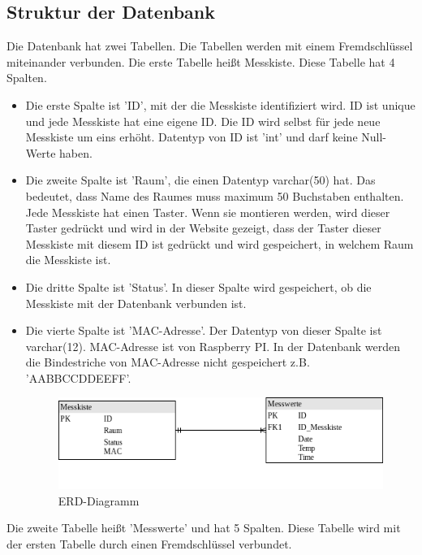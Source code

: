 	\subsection{Struktur der Datenbank}
	Die Datenbank hat zwei Tabellen. Die Tabellen werden mit einem Fremdschl\"ussel miteinander verbunden. Die erste Tabelle hei{\ss}t Messkiste. Diese Tabelle hat 4 Spalten. 
	\begin{itemize}
		\item Die erste Spalte ist 'ID', mit der die Messkiste identifiziert wird. ID ist unique und jede Messkiste hat eine eigene ID. Die ID wird selbst f\"ur jede neue Messkiste um eins erh\"oht. Datentyp von ID ist 'int' und darf keine Null-Werte haben. 
		\item Die zweite Spalte ist 'Raum', die einen Datentyp varchar(50) hat. Das bedeutet, dass Name des Raumes muss maximum 50 Buchstaben enthalten. Jede Messkiste hat einen Taster. Wenn sie montieren werden, wird dieser Taster gedr\"uckt und wird in der Website gezeigt, dass der Taster dieser Messkiste mit diesem ID ist gedr\"uckt und wird gespeichert, in welchem Raum die Messkiste ist.
		\item Die dritte Spalte ist 'Status'. In dieser Spalte wird gespeichert, ob die Messkiste mit der Datenbank verbunden ist. 
		\item Die vierte Spalte ist 'MAC-Adresse'. Der Datentyp von dieser Spalte ist varchar(12). MAC-Adresse ist von Raspberry PI. In der Datenbank werden die Bindestriche von MAC-Adresse nicht gespeichert z.B. 'AABBCCDDEEFF'.
		\begin{figure}
			\centering
			\includegraphics[scale=0.7]{./bilder/db.png}
			\caption{ERD-Diagramm}
			\label{fi:ERD}
		\end{figure} 
		\end{itemize}
	Die zweite Tabelle hei{\ss}t 'Messwerte' und hat 5 Spalten. Diese Tabelle wird mit der ersten Tabelle durch einen Fremdschl\"ussel verbundet.
